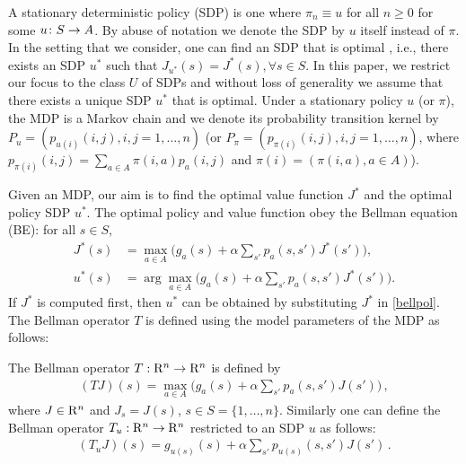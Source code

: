 A stationary deterministic policy (SDP) is one where $\pi_n\equiv u$ for all $n\geq 0$ for some $u\colon S \rightarrow A$. By abuse of notation we denote the SDP by $u$ itself instead of $\pi$. In the setting that we consider, one can find an SDP that is optimal \cite{BertB,Puter}, i.e., there exists an SDP $u^*$ such that $J_{u^*}(s)=J^*(s),\forall s\in S$. In this paper, we restrict our focus to the class $U$ of SDPs and without loss of generality we assume that there exists a unique SDP $u^*$ that is optimal. Under a stationary policy $u$ (or $\pi$), the MDP is a Markov chain and we denote its probability transition kernel by $P_u=(p_{u(i)}(i,j),i,j=1,\ldots,n)$ (or $P_\pi=(p_{\pi(i)}(i,j),i,j=1,\ldots,n)$, where $p_{\pi(i)}(i,j)=\sum_{a\in A}\pi(i,a)p_a(i,j)$ and $\pi(i)=(\pi(i,a), a\in A)$).\par
{}
Given an MDP, our aim is to find the optimal value function $J^*$ and the optimal policy SDP $u^*$. The optimal policy and value function obey the Bellman equation (BE): for all $ s \in S$, 
\begin{subequations}\label{bell}
\begin{align}
\label{bellval}J^*(s)&=\max_{ a\in A}\big(g_a(s)+\alpha \sum_{s'}p_a(s,s')J^*(s')\big),\\
\label{bellpol}u^*(s)&=\arg\max_{ a\in A}\big(g_a(s)+\alpha \sum_{s'}p_a(s,s')J^*(s')\big).
\end{align}
\end{subequations}
If $J^*$ is computed first, then $u^*$ can be obtained by substituting $J^*$ in \eqref{bellpol}. The Bellman operator $T$ is defined using the model parameters of the MDP as follows:
\begin{definition}
The Bellman operator $T: \mathrm{R}^n \to \mathrm{R}^n$ is defined by 
\begin{align}
(TJ)(s)=\max_{a \in A}\big(g_a(s)+\alpha \sum_{s'} p_a(s,s')J(s')\big)\,, 
\end{align}
where $J\in \mathrm{R}^n$ and $J_s = J(s)$, $s\in S = \{1,\dots,n\}$.  
Similarly one can define the Bellman operator $T_u:\mathrm{R}^n \to \mathrm{R}^n$ restricted to an SDP $u$ as follows:
\begin{align}
(T_uJ)(s)=g_{u(s)}(s)+\alpha \sum_{s'} p_{u(s)}(s,s')J(s')\,.
\end{align}
\end{definition}
